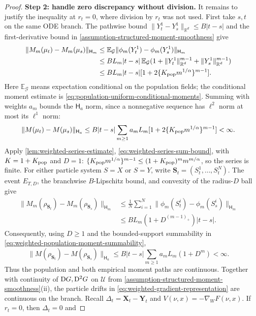 \begin{proof}
\par\noindent\textbf{Step 2: handle zero discrepancy without division.}
It remains to justify the inequality at $r_t=0$, where division by $r_t$
was not used. First take $s,t$ on the same ODE branch. The pathwise bound
$\|Y_t^1-Y_s^1\|_{\mathbb R^d}\le B|t-s|$ and the first-derivative bound in
\cref{assumption-structured-moment-smoothness} give
\[
\begin{aligned}
 \|M_m(\mu_t)-M_m(\mu_s)\|_{\mathsf H_m}
 &\le\mathbb E_{\mathcal G}\|\phi_m(Y_t^1)-\phi_m(Y_s^1)\|_{\mathsf H_m}\\
 &\le BL_m|t-s|\,\mathbb E_{\mathcal G}
        (1+\|Y_t^1\|_{\mathbb R^d}^{m-1}+\|Y_s^1\|_{\mathbb R^d}^{m-1})\\
 &\le BL_m|t-s|
        [1+2\{K_{\rm pop}m^{1/\alpha}\}^{m-1}].
\end{aligned}
\]
Here $\mathbb E_{\mathcal G}$ means expectation conditional on the
population fields; the conditional moment estimate is
\eqref{eq:population-uniform-conditional-moments}. Summing with weights
$a_m$ bounds the $\mathsf H_a$ norm, since a nonnegative sequence has
$\ell^2$ norm at most its $\ell^1$ norm:
\[
 \|M(\mu_t)-M(\mu_s)\|_{\mathsf H_a}
 \le B|t-s|\sum_{m\ge1}a_mL_m
        [1+2\{K_{\rm pop}m^{1/\alpha}\}^{m-1}]<\infty.
\]
Apply \cref{lem:weighted-series-estimate},
\eqref{eq:weighted-series-sum-bound}, with $K=1+K_{\rm pop}$ and $D=1$:
$\{K_{\rm pop}m^{1/\alpha}\}^{m-1}
\le(1+K_{\rm pop})^m m^{m/\alpha}$, so the series is finite.
For either particle system $S=X$ or $S=Y$, write
$\mathbf S_t=(S_t^1,\ldots,S_t^N)$. The event $E_{T,D}$, the
branchwise $B$-Lipschitz bound, and convexity of the radius-$D$ ball give
\[
\begin{aligned}
 \|M_m(\rho_{\mathbf S_t})-M_m(\rho_{\mathbf S_s})\|_{\mathsf H_m}
 &\le\frac1N\sum_{i=1}^N
       \|\phi_m(S_t^i)-\phi_m(S_s^i)\|_{\mathsf H_m}\\
 &\le BL_m(1+D^{(m-1)_+})|t-s|.
\end{aligned}
\]
Consequently, using $D\ge1$ and the bounded-support summability in
\cref{eq:weighted-population-moment-summability},
\[
 \|M(\rho_{\mathbf S_t})-M(\rho_{\mathbf S_s})\|_{\mathsf H_a}
 \le B|t-s|\sum_{m\ge1}a_mL_m(1+D^m)<\infty.
\]
Thus the population and both empirical moment paths are continuous.
Together with continuity of $\mathrm{D} G,\mathrm{D}^2G$ on $\mathcal U$ from
\cref{assumption-structured-moment-smoothness}(ii), the particle drifts
in \eqref{eq:weighted-gradient-representation} are continuous on the branch.
Recall $\Delta_t=\mathbf X_t-\mathbf Y_t$ and
$V(\nu,x)=-\nabla_WF(\nu,x)$. If $r_t=0$, then $\Delta_t=0$ and

\end{proof}
